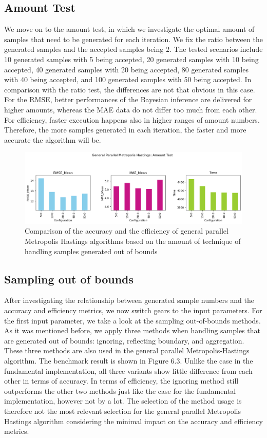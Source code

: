 \subsection{Amount Test}
We move on to the amount test, in which we investigate the optimal amount of samples that need to be generated for each iteration. We fix the ratio between the generated samples and the accepted samples being $2$. The tested scenarios include 10 generated samples with 5 being accepted, 20 generated samples with 10 being accepted, 40 generated samples with 20 being accepted, 80 generated samples with 40 being accepted, and 100 generated samples with 50 being accepted. In comparison with the ratio test, the differences are not that obvious in this case. For the RMSE, better performances of the Bayesian inference are delivered for higher amounts, whereas the MAE data do not differ too much from each other. For efficiency, faster execution happens also in higher ranges of amount numbers. Therefore, the more samples generated in each iteration, the faster and more accurate the algorithm will be.

\begin{figure}[H]
    \centering
    \includegraphics[width=1\textwidth]{figures/gpmh/amount_test.png}
    \captionsetup{width=.8\textwidth}
    \caption{Comparison of the accuracy and the efficiency of general parallel Metropolis Hastings algorithms based on the amount of technique of handling samples generated out of bounds}
    \label{fig:enter-label}
\end{figure}

\subsection{Sampling out of bounds}
After investigating the relationship between generated sample numbers and the accuracy and efficiency metrics, we now switch gears to the input parameters. For the first input parameter, we take a look at the sampling out-of-bounds methods. As it was mentioned before, we apply three methods when handling samples that are generated out of bounds: ignoring, reflecting boundary, and aggregation. These three methods are also used in the general parallel Metropolis-Hastings algorithm. The benchmark result is shown in Figure 6.3. Unlike the case in the fundamental implementation, all three variants show little difference from each other in terms of accuracy. In terms of efficiency, the ignoring method still outperforms the other two methods just like the case for the fundamental implementation, however not by a lot. The selection of the method usage is therefore not the most relevant selection for the general parallel Metropolis Hastings algorithm considering the minimal impact on the accuracy and efficiency metrics.

